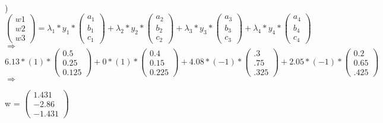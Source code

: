 \documentclass[12pt]{article}
\begin{document}
\noindent \hrulefill \\



) $
\begin{pmatrix}
w1\\ w2\\ w3
\end{pmatrix}
= \lambda_1 * y_1 * 
\begin{pmatrix}
a_1\\ b_1\\ c_1
\end{pmatrix}
+ \lambda_2 * y_2 * 
\begin{pmatrix}
a_2\\ b_2\\ c_2
\end{pmatrix}
+ \lambda_3 * y_3 * 
\begin{pmatrix}
a_3\\ b_3\\ c_3
\end{pmatrix}
+ \lambda_4 * y_4 * 
\begin{pmatrix}
a_4\\ b_4\\ c_4
\end{pmatrix}$$\Rightarrow$\\[.4em]

$6.13 * (1) * 
\begin{pmatrix}
0.5\\ 0.25\\ 0.125
\end{pmatrix}
+ 0 * (1) * 
\begin{pmatrix}
0.4\\ 0.15\\ 0.225
\end{pmatrix}
+ 4.08 * (-1) * 
\begin{pmatrix}
.3\\ .75\\ .325
\end{pmatrix}
+ 2.05 * (-1) * 
\begin{pmatrix}
0.2\\ 0.65\\ .425
\end{pmatrix}$$\Rightarrow$\\[.4em]

\begin{center}
w = $\begin{pmatrix}
1.431\\ -2.86\\ -1.431
\end{pmatrix}$\\[-.4em]
\end{center}
\end{document}
